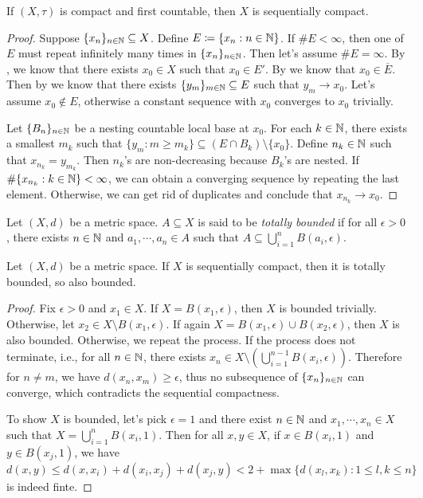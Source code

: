 \documentclass{techreport}
\begin{document}
\begin{proposition}\label{Prop:CompactFstCountThenSeqCompact}
	If $(X,\tau)$ is compact and first countable, then $X$ is sequentially compact.
\end{proposition}
\begin{proof}
	Suppose $\{x_n\}_{n \in \mathbb{N}} \subseteq X$.
	Define $E \coloneqq \{ x_n : n \in \mathbb{N} \}$.
	If $\#E < \infty$, then one of $E$ must repeat infinitely many times in $\{x_n\}_{n \in \mathbb{N}}$.
	Then let's assume $\#E = \infty$.
	By , we know that there exists $x_0 \in X$ such that $x_0 \in E'$.
	By  we know that $x_0 \in \overline{E}$.
	Then by  we know that there exists $\{y_m\}_{m \in \mathbb{N}} \subseteq E$ such that $y_m \rightarrow x_0$.
	Let's assume $x_0 \not\in E$, otherwise a constant sequence with $x_0$ converges to $x_0$ trivially.
	
	Let $\{B_n\}_{n \in \mathbb{N}}$ be a nesting countable local base at $x_0$.
	For each $k \in \mathbb{N}$, there exists a smallest $m_k$ such that $\{ y_m : m \ge m_k\} \subseteq (E \cap B_k) \setminus \{x_0\}$.
	Define $n_k \in \mathbb{N}$ such that $x_{n_k} = y_{m_k}$.
	Then $n_k$'s are non-decreasing because $B_k$'s are nested.
	If $\#\{ x_{n_k} : k \in \mathbb{N} \} < \infty$, we can obtain a converging sequence by repeating the last element.
	Otherwise, we can get rid of duplicates and conclude that $x_{n_k} \rightarrow x_0$.
\end{proof}

\begin{definition}\label{De:TotallyBoundedness}
	Let $(X,d)$ be a metric space.
	$A \subseteq X$ is said to be \emph{totally bounded} if for all $\epsilon > 0$, there exists $n 	\in \mathbb{N}$ and $a_1,\cdots,a_n \in A$ such that $A \subseteq \bigcup_{i=1}^n B(a_i,\epsilon)$.
\end{definition}

\begin{lemma}\label{Lem:MetricSeqCompactIsTotallyBounded}
	Let $(X,d)$ be a metric space.
	If $X$ is sequentially compact, then it is totally bounded, so also bounded.
\end{lemma}
\begin{proof}
	Fix $\epsilon > 0$ and $x_1 \in X$.
	If $X = B(x_1,\epsilon)$, then $X$ is bounded trivially.
	Otherwise, let $x_2 \in X \setminus B(x_1,\epsilon)$.
	If again $X = B(x_1,\epsilon) \cup B(x_2,\epsilon)$, then $X$ is also bounded.
	Otherwise, we repeat the process.
	If the process does not terminate, i.e., for all $n \in \mathbb{N}$, there exists $x_n \in X \setminus (\bigcup_{i=1}^{n-1} B(x_i,\epsilon))$.
	Therefore for $n \neq m$, we have $d(x_n,x_m) \ge \epsilon$, thus no subsequence of $\{x_n\}_{n \in \mathbb{N}}$ can converge, which contradicts the sequential compactness.
	
	To show $X$ is bounded, let's pick $\epsilon =1$ and there exist $n \in \mathbb{N}$ and $x_1,\cdots,x_n \in X$ such that $X = \bigcup_{i=1}^n B(x_i,1)$.
	Then for all $x,y \in X$, if $x \in B(x_i,1)$ and $y \in B(x_j,1)$, we have
	\[
	d(x,y) \le d(x,x_i) + d(x_i,x_j) + d(x_j,y) < 2 + \max\{ d(x_l,x_k): 1 \le l,k \le n \}
	\]
	is indeed finte.
\end{proof}
\end{document}

